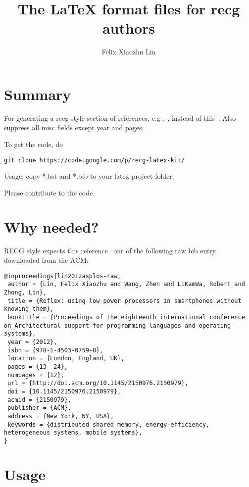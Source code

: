 \documentclass[letterpaper,11pt]{article}
\title{The \LaTeX{} format files for recg authors}
\author{Felix Xiaozhu Lin}
\begin{document}
\maketitle

\section{Summary}

For generating a recg-style section of references, e.g.,~\cite{lin2012asplos}, instead of this~\cite{lin2012asplos-raw}.
Also suppress all misc fields except year and pages.

To get the code, do
\begin{lstlisting}
git clone https://code.google.com/p/recg-latex-kit/
\end{lstlisting}

Usage: copy *.bst and *.bib to your latex project folder.

Please contribute to the code.

\section{Why needed?}
RECG style expects this reference~\cite{lin2012asplos} out of the following raw bib entry downloaded from the ACM:

\begin{lstlisting}
@inproceedings{lin2012asplos-raw,
 author = {Lin, Felix Xiaozhu and Wang, Zhen and LiKamWa, Robert and Zhong, Lin},
 title = {Reflex: using low-power processors in smartphones without knowing them},
 booktitle = {Proceedings of the eighteenth international conference on Architectural support for programming languages and operating systems},
 year = {2012},
 isbn = {978-1-4503-0759-8},
 location = {London, England, UK},
 pages = {13--24},
 numpages = {12},
 url = {http://doi.acm.org/10.1145/2150976.2150979},
 doi = {10.1145/2150976.2150979},
 acmid = {2150979},
 publisher = {ACM},
 address = {New York, NY, USA},
 keywords = {distributed shared memory, energy-efficiency, heterogeneous systems, mobile systems},
} 
\end{lstlisting}

\section{Usage}
\end{document}

